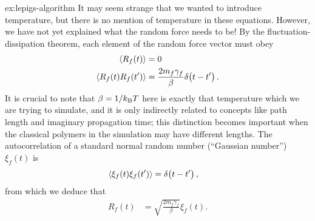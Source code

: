 \begin{DefAnswer}{ex:lepigs-algorithm}
	It may seem strange that we wanted to introduce temperature, but there is no mention of temperature in these equations.
	However, we have not yet explained what the random force needs to be!
	By the fluctuation-dissipation theorem, each element of the random force vector must obey~\cite[5-6]{zwanzig2001nonequilibrium}
	\begin{subequations}
	\begin{align}
		\langle R_f(t) \rangle
		&= 0 \\
		\langle R_f(t) R_f(t') \rangle
		&= \frac{2 m_f \gamma_f}{\beta} \delta\!\left( t - t' \right).
	\end{align}
	\end{subequations}
	It is crucial to note that $\beta = 1/k_\mathrm{B} T$ here is exactly that temperature which we are trying to simulate, and it is only indirectly related to concepts like path length and imaginary propagation time; this distinction becomes important when the classical polymers in the simulation may have different lengths.
	The autocorrelation of a standard normal random number (``Gaussian number'') $\xi_f(t)$ is~\cite{ceriotti2010efficient}
	\begin{align}
		\langle \xi_f(t) \xi_f(t') \rangle
		&= \delta\!\left( t - t' \right),
	\end{align}
	from which we deduce that
	\begin{align}
		R_f(t)
		&= \sqrt{\frac{2 m_f \gamma_f}{\beta}} \xi_f(t).
	\end{align}


\end{DefAnswer}
